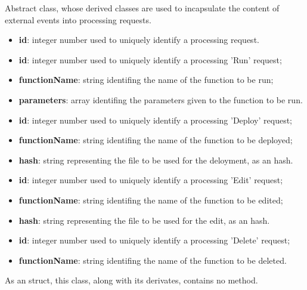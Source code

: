 	Abstract class, whose derived classes are used to incapsulate the content of external events into processing requests.
	\begin{itemize}
		\item \textbf{id}: integer number used to uniquely identify a processing request.
	\end{itemize}
	\begin{itemize}
		\item \textbf{id}: integer number used to uniquely identify a processing 'Run' request;
		\item \textbf{functionName}: string identifing the name of the function to be run;
		\item \textbf{parameters}: array identifing the parameters given to the function to be run.
	\end{itemize}
	\begin{itemize}
		\item \textbf{id}: integer number used to uniquely identify a processing 'Deploy' request;
		\item \textbf{functionName}: string identifing the name of the function to be deployed;
		\item \textbf{hash}: string representing the file to be used for the deloyment, as an hash.
	\end{itemize}
	\begin{itemize}
		\item \textbf{id}: integer number used to uniquely identify a processing 'Edit' request;
		\item \textbf{functionName}: string identifing the name of the function to be edited;
		\item \textbf{hash}: string representing the file to be used for the edit, as an hash.
	\end{itemize}
	\begin{itemize}
		\item \textbf{id}: integer number used to uniquely identify a processing 'Delete' request;
		\item \textbf{functionName}: string identifing the name of the function to be deleted.
	\end{itemize}
	
	As an struct, this class, along with its derivates, contains no method.	
